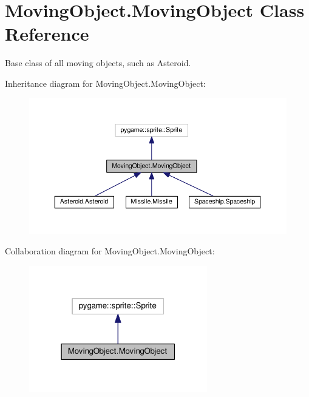 \hypertarget{classMovingObject_1_1MovingObject}{}\section{Moving\+Object.\+Moving\+Object Class Reference}
\label{classMovingObject_1_1MovingObject}


Base class of all moving objects, such as Asteroid.  




Inheritance diagram for Moving\+Object.\+Moving\+Object\+:\nopagebreak
\begin{figure}[H]
\begin{center}
\leavevmode
\includegraphics[width=350pt]{classMovingObject_1_1MovingObject__inherit__graph}
\end{center}
\end{figure}


Collaboration diagram for Moving\+Object.\+Moving\+Object\+:\nopagebreak
\begin{figure}[H]
\begin{center}
\leavevmode
\includegraphics[width=220pt]{classMovingObject_1_1MovingObject__coll__graph}
\end{center}
\end{figure}
